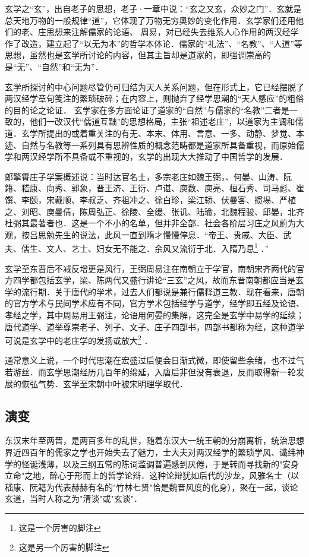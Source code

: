 玄学之“玄”，出自老子的思想，老子·一章中说：“玄之又玄，众妙之门”．玄就是总天地万物的一般规律“道”，它体现了万物无穷奥妙的变化作用．玄学家们还用他们的老、庄思想来注解儒家的论语、
周易，对已经失去维系人心作用的两汉经学作了改造，建立起了“以无为本”的哲学本体论．儒家的“礼法”、“名教”、“人道”等思想，虽然也是玄学所讨论的内容，但其主旨却是道家的，即强调崇高的是“无”、“自然”和“无为”．

玄学所探讨的中心问题尽管仍可归结为天人关系问题，但在形式上，它已经摆脱了两汉经学章句笺注的繁琐破碎；在内容上，则抛弃了经学思潮的“天人感应”的粗俗的目的论之论证． 玄学家在多方面论证了道家的“自然”与儒家的“名教”二者是一致的，他们一改汉代“儒道互黜”的思想格局，主张“祖述老庄”，以道家为主调和儒道．玄学所提出的或着重关注的有无、本末、体用、言意、一多、动静、梦觉、本迹、自然与名教等一系列具有思辨性质的概念范畴都是道家所具备重视，而原始儒学和两汉经学所不具备或不重视的，玄学的出现大大推动了中国哲学的发展．

郎擎霄庄子学案概述说：当时达官名士，多宗老庄如魏王弼，、何晏、山涛、阮籍、嵇康、向秀、郭象，晋王济、王衍、卢谌、庾数、庾亮、桓石秀、司马彪、崔馔、李颐，宋戴顺、李叔乏、齐祖冲之、徐白珍，梁江轿、伏曼客、掼埸、严植之、刘昭、庾曼倩，陈周弘正、徐陵、全缓、张讥、陆瑜，北魏程骏、邱晏，北齐杜弼其最著者也．这是一个不小的名单，但并非全部．社会各阶层习庄之风蔚为大观，按吕思勉先生的说法，此风一直到隋才慢慢停息．“帝王、贵戚、大臣、武夫、儒生、文人、艺士、妇女无不能之．余风又流衍于北．入隋乃息\footnote{这是一个厉害的脚注} ．”

玄学至东晋后不减反增更是风行，王弼周易注在南朝立于学官，南朝宋齐两代的官方四学都包括玄学，梁、陈两代又盛行讲论“三玄”之风，故而东晋南朝都应当是玄学的流行期．关于唐代的学术，过去人们都说是兼行儒释道三教．现在看来，唐朝的官方学术与民间学术应有不同，官方学术包括经学与道学，经学即五经及论语、孝经之学，其中周易用王弼注，论语用何晏的集解，这完全是玄学中易学的延续；唐代道学、道举尊崇老子、列子、文子、庄子四部书，四部书都称为经，这种道学可说是玄学中的老庄学的发扬或放大\footnote{这是另一个厉害的脚注}  ．

通常意义上说，一个时代思潮在宏盛过后便会日渐式微，即使留些余绪，也不过气若游丝．而玄学思潮经历几百年的绵延，入唐后非但没有衰退，反而取得新一轮发展的恢弘气势．玄学至宋朝中叶被宋明理学取代．\cite{bollag2010clinical}

\subsection{演变}

东汉末年至两晋，是两百多年的乱世，随着东汉大一统王朝的分崩离析，统治思想界近四百年的儒家之学也开始失去了魅力，士大夫对两汉经学的繁琐学风、谶纬神学的怪诞浅薄，以及三纲五常的陈词滥调普遍感到厌倦，于是转而寻找新的"安身立命"之地，醉心于形而上的哲学论辩．这种论辩犹如后代的沙龙，风雅名士（以嵇康、阮籍为代表赫赫有名的"竹林七贤"恰是魏晋风度的化身），聚在一起，谈论玄道，当时人称之为"清谈"或"玄谈"．

